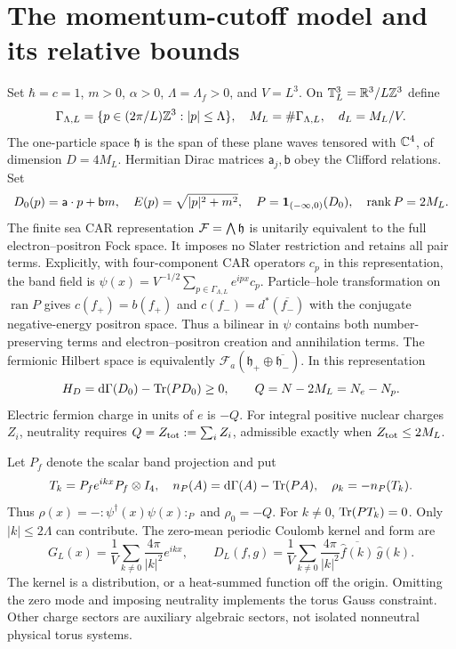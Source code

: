 \section{The momentum-cutoff model and its relative bounds}
\label{sec:model}
Set $\hbar=c=1$, $m>0$, $\alpha>0$, $\Lambda=\Lambda_f>0$, and $V=L^3$.
On $\mathbb T_L^3=\mathbb R^3/L\mathbb Z^3$ define
\[
\Gamma_{\Lambda,L}=\{p\in(2\pi/L)\mathbb Z^3:|p|\le\Lambda\},\quad
M_L=\#\Gamma_{\Lambda,L},\quad d_L=M_L/V.
\]
The one-particle space $\mathfrak h$ is the span of these plane waves
tensored with $\mathbb C^4$, of dimension $D=4M_L$.
Hermitian Dirac matrices $\mathsf a_j,\mathsf b$ obey the Clifford
relations. Set
\[
D_0(p)=\mathsf a\cdot p+\mathsf b m,\quad E(p)=\sqrt{|p|^2+m^2},
\quad P=\mathbf1_{(-\infty,0)}(D_0),\quad \operatorname{rank} P=2M_L.
\]
The finite sea CAR representation $\mathcal F=\bigwedge\mathfrak h$ is
unitarily equivalent to the full electron--positron Fock space.
It imposes no Slater restriction and retains all pair terms.
Explicitly, with four-component CAR operators $c_p$ in this
representation, the band field is
$\psi(x)=V^{-1/2}\sum_{p\in\Gamma_{\Lambda,L}}e^{ipx}c_p$.
Particle--hole transformation on $\operatorname{ran}P$ gives
$c(f_+)=b(f_+)$ and $c(f_-)=d^*(\overline{f_-})$ with the
conjugate negative-energy positron space. Thus a bilinear in $\psi$
contains both number-preserving terms and electron--positron
creation and annihilation terms. The fermionic Hilbert space is
equivalently $\mathcal F_a(\mathfrak h_+\oplus\overline{\mathfrak h_-})$.
In this representation
\[
H_D=\mathrm d\Gamma(D_0)-\operatorname{Tr}(PD_0)\ge0,\qquad Q=N-2M_L=N_e-N_p.
\]
Electric fermion charge in units of $e$ is $-Q$.
For integral positive nuclear charges $Z_i$, neutrality requires
$Q=Z_{\rm tot}:=\sum_iZ_i$, admissible exactly when $Z_{\rm tot}\le2M_L$.

Let $P_f$ denote the scalar band projection and put
\[
T_k=P_fe^{ikx}P_f\otimes I_4,\quad
n_P(A)=\mathrm d\Gamma(A)-\operatorname{Tr}(PA),\quad
\rho_k=-n_P(T_k).
\]
Thus $\rho(x)=-:\!\psi^\dagger(x)\psi(x)\!:_P$ and $\rho_0=-Q$.
For $k\ne0$, $\operatorname{Tr}(PT_k)=0$. Only $|k|\le2\Lambda$ can contribute.
The zero-mean periodic Coulomb kernel and form are
\begin{equation}
G_L(x)=\frac1V\sum_{k\ne0}\frac{4\pi}{|k|^2}e^{ikx},\qquad
D_L(f,g)=\frac1V\sum_{k\ne0}\frac{4\pi}{|k|^2}
\overline{\widehat f(k)}\,\widehat g(k).
\label{eq:coulomb}
\end{equation}
The kernel is a distribution, or a heat-summed function off the origin.
Omitting the zero mode and imposing neutrality implements the torus
Gauss constraint. Other charge sectors are auxiliary algebraic sectors,
not isolated nonneutral physical torus systems.

